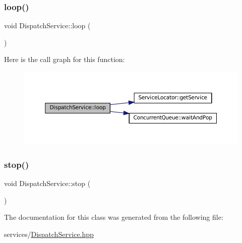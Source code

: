\subsubsection{\texorpdfstring{loop()}{loop()}}
{\footnotesize\ttfamily void Dispatch\+Service\+::loop (\begin{DoxyParamCaption}{ }\end{DoxyParamCaption})\hspace{0.3cm}{\ttfamily [inline]}}

Here is the call graph for this function\+:
\nopagebreak
\begin{figure}[H]
\begin{center}
\leavevmode
\includegraphics[width=350pt]{classDispatchService_aa7b4c44dbb842aa208e4109da6c68465_cgraph}
\end{center}
\end{figure}
\mbox{\label{classDispatchService_ab0fac2c10f5d1dd90847736cab05fb10}} 
\subsubsection{\texorpdfstring{stop()}{stop()}}
{\footnotesize\ttfamily void Dispatch\+Service\+::stop (\begin{DoxyParamCaption}{ }\end{DoxyParamCaption})\hspace{0.3cm}{\ttfamily [inline]}}



The documentation for this class was generated from the following file\+:\begin{DoxyCompactItemize}
\item 
services/\mbox{\hyperlink{DispatchService_8hpp}{Dispatch\+Service.\+hpp}}\end{DoxyCompactItemize}
